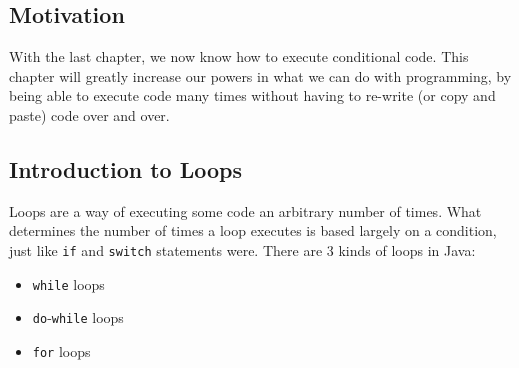 
\subsection{Motivation}
With the last chapter, we now know how to execute conditional code. This chapter will greatly increase our powers in what we can do with programming, by being able to execute code many times without having to re-write (or copy and paste) code over and over.

\subsection{Introduction to Loops}
Loops are a way of executing some code an arbitrary number of times. What determines the number of times a loop executes is based largely on a condition, just like \verb|if| and \verb|switch| statements were. There are 3 kinds of loops in Java:
\begin{itemize}
\item \verb|while| loops
\item \verb|do|-\verb|while| loops
\item \verb|for| loops
\end{itemize}

